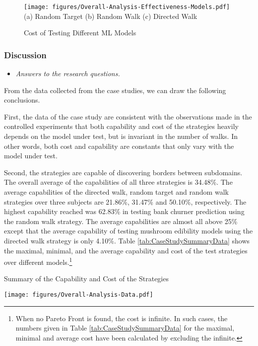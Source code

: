 \documentclass[preprint,1p,authoryear,times]{elsarticle}
\begin{document}
\begin{figure}[h]
	\centering
	\texttt{[image: figures/Overall-Analysis-Effectiveness-Models.pdf]}\\
	\scriptsize{(a) Random Target \hspace{2.5cm} (b) Random Walk \hspace{2.5cm} (c) Directed Walk}
	\caption{Cost of Testing Different ML Models}
	\label{fig:CaseStudyAvgEffectiveness}
\end{figure}

\subsubsection{Discussion}

\begin{itemize}
\item \emph{Answers to the research questions.}
\end{itemize}

From the data collected from the case studies, we can draw the following conclusions. 

First, the data of the case study are consistent with the observations made in the controlled experiments that both capability and cost of the strategies heavily depends on the model under test, but is invariant in the number of walks. In other words, both cost and capability are constants that only vary with the model under test. 

Second, the strategies are capable of discovering borders between subdomains. The overall average of the capabilities of all three strategies is 34.48\%. The average capabilities of the directed walk, random target and random walk strategies over three subjects are 21.86\%, 31.47\% and 50.10\%, respectively. The highest capability reached was 62.83\% in testing bank churner prediction using the random walk strategy. The average capabilities are almost all above 25\% except that the average capability of testing mushroom edibility models using the directed walk strategy is only 4.10\%. Table \ref{tab:CaseStudySummaryData} shows the maximal, minimal, and the average capability and cost of the test strategies over different models.\footnote{When no Pareto Front is found, the cost is infinite. In such cases, the numbers given in Table \ref{tab:CaseStudySummaryData} for the maximal, minimal and average cost have been calculated by excluding the infinite.} 

\begin{table}[h]
	\centering
	\caption{Summary of the Capability and Cost of the Strategies}
	\texttt{[image: figures/Overall-Analysis-Data.pdf]}
	\label{tab:CaseStudySummaryData}
\end{table}
\end{document}

